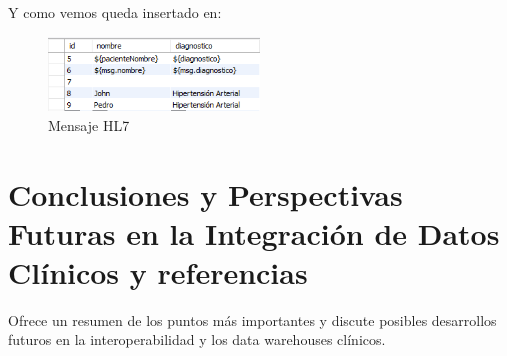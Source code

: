 \documentclass[12pt, a4paper, twoside]{article}
\begin{document}
	Y como vemos queda insertado en: 
	
	\begin{figure}[h!]
		\centering
		\includegraphics[width=0.5\textwidth]{image/10.png}
		\caption{Mensaje HL7}
		\label{fig:10}
	\end{figure}
	
	\section{Conclusiones y Perspectivas Futuras en la Integración de Datos Clínicos y referencias}
	Ofrece un resumen de los puntos más importantes y discute posibles desarrollos futuros en la interoperabilidad y los data warehouses clínicos.
	
	\printbibliography
	
	
	
	
\end{document}
